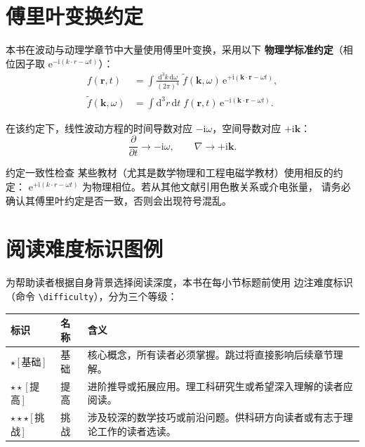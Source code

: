 \documentclass[12pt,a4paper,openany,oneside]{book}
\newcommand{\diff}{\mathrm{d}}
\newcommand{\ii}{\mathrm{i}}
\newcommand{\ee}{\mathrm{e}}
\newcommand{\vect}[1]{\bm{#1}}
\begin{document}
\section*{傅里叶变换约定}

本书在波动与动理学章节中大量使用傅里叶变换，采用以下
\textbf{物理学标准约定}（相位因子取 $\ee^{-\ii(k\cdot r-\omega t)}$）：
\begin{align}
f(\vect{r},t) &= \int \frac{\diff^3 k\,\diff\omega}{(2\pi)^4}\;
\tilde{f}(\vect{k},\omega)\,\ee^{+\ii(\vect{k}\cdot\vect{r}-\omega t)}, \\
\tilde{f}(\vect{k},\omega) &= \int \diff^3 r\,\diff t\;
f(\vect{r},t)\,\ee^{-\ii(\vect{k}\cdot\vect{r}-\omega t)}.
\end{align}

在该约定下，线性波动方程的时间导数对应 $-\ii\omega$，空间导数对应 $+\ii\vect{k}$：
\begin{equation}
\frac{\partial}{\partial t} \to -\ii\omega, \qquad \nabla \to +\ii\vect{k}.
\label{eq:ch1-fourier-operator}
\end{equation}

\begin{warning}{约定一致性检查}{}
某些教材（尤其是数学物理和工程电磁学教材）使用相反的约定：
$\ee^{+\ii(k\cdot r-\omega t)}$ 为物理相位。若从其他文献引用色散关系或介电张量，
请务必确认其傅里叶约定是否一致，否则会出现符号混乱。
\end{warning}


\section*{阅读难度标识图例}

为帮助读者根据自身背景选择阅读深度，本书在每小节标题前使用
边注难度标识（命令 \texttt{\textbackslash difficulty}），分为三个等级：

\begin{table}[htbp]
\centering
\begin{tabular}{@{}llp{8cm}@{}}
\toprule
\textbf{标识} & \textbf{名称} & \textbf{含义} \\
\midrule
$\star$\,[\,基础\,] & 基础 & 核心概念，所有读者必须掌握。跳过将直接影响后续章节理解。 \\
$\star\star$\,[\,提高\,] & 提高 & 进阶推导或拓展应用。理工科研究生或希望深入理解的读者应阅读。 \\
$\star\star\star$\,[\,挑战\,] & 挑战 & 涉及较深的数学技巧或前沿问题。供科研方向读者或有志于理论工作的读者选读。 \\
\bottomrule
\end{tabular}
\end{table}
\end{document}
